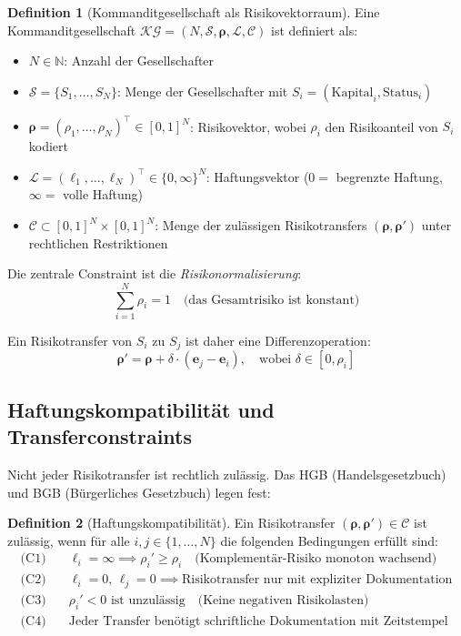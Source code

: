 \documentclass[a4paper,12pt]{article}
\theoremstyle{definition}
\newtheorem{definition}{Definition}
\begin{document}
\begin{definition}[Kommanditgesellschaft als Risikovektorraum]
Eine Kommanditgesellschaft $\mathcal{KG} = (N, \mathcal{S}, \boldsymbol{\rho}, \mathcal{L}, \mathcal{C})$ ist definiert als:
\begin{itemize}
    \item $N \in \mathbb{N}$: Anzahl der Gesellschafter
    \item $\mathcal{S} = \{S_1, \ldots, S_N\}$: Menge der Gesellschafter mit $S_i = (\text{Kapital}_i, \text{Status}_i)$
    \item $\boldsymbol{\rho} = (\rho_1, \ldots, \rho_N)^{\top} \in [0,1]^N$: Risikovektor, wobei $\rho_i$ den Risikoanteil von $S_i$ kodiert
    \item $\mathcal{L} = (\ell_1, \ldots, \ell_N)^{\top} \in \{0, \infty\}^N$: Haftungsvektor ($0 = $ begrenzte Haftung, $\infty = $ volle Haftung)
    \item $\mathcal{C} \subset [0,1]^N \times [0,1]^N$: Menge der zulässigen Risikotransfers $({\boldsymbol{\rho}}, {\boldsymbol{\rho}}')$ unter rechtlichen Restriktionen
\end{itemize}
\end{definition}

Die zentrale Constraint ist die \emph{Risikonormalisierung}:
\begin{equation}
\sum_{i=1}^N \rho_i = 1 \quad \text{(das Gesamtrisiko ist konstant)}
\end{equation}

Ein Risikotransfer von $S_i$ zu $S_j$ ist daher eine Differenzoperation:
\begin{equation}
\boldsymbol{\rho}' = \boldsymbol{\rho} + \delta \cdot (\mathbf{e}_j - \mathbf{e}_i), \quad \text{wobei } \delta \in [0, \rho_i]
\end{equation}

\subsection{Haftungskompatibilität und Transferconstraints}

Nicht jeder Risikotransfer ist rechtlich zulässig. Das HGB (Handelsgesetzbuch) und BGB (Bürgerliches Gesetzbuch) legen fest:

\begin{definition}[Haftungskompatibilität]
Ein Risikotransfer $({\boldsymbol{\rho}}, {\boldsymbol{\rho}}') \in \mathcal{C}$ ist zulässig, wenn für alle $i,j \in \{1,\ldots,N\}$ die folgenden Bedingungen erfüllt sind:
\begin{align}
\text{(C1)} \quad &\ell_i = \infty \implies \rho_i' \geq \rho_i \quad \text{(Komplementär-Risiko monoton wachsend)}\\
\text{(C2)} \quad &\ell_i = 0, \, \ell_j = 0 \implies \text{Risikotransfer nur mit expliziter Dokumentation}\\
\text{(C3)} \quad &\rho_i' < 0 \text{ ist unzulässig} \quad \text{(Keine negativen Risikolasten)}\\
\text{(C4)} \quad &\text{Jeder Transfer benötigt schriftliche Dokumentation mit Zeitstempel}
\end{align}
\end{definition}
\end{document}
